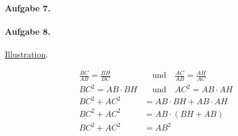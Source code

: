 \documentclass{article}
\begin{document}
\paragraph{Aufgabe 7.} 

\paragraph{Aufgabe 8.}

\href{https://commons.wikimedia.org/wiki/File:Pythagoras_similar_triangles_simplified.svg}{Illustration}.

\begin{align*}
    \frac{BC}{AB} = \frac{BH}{BC} &\quad\text{und}\quad \frac{AC}{AB} = \frac{AH}{AC} \\
    BC^2 = AB \cdot BH &\quad\text{und}\quad AC^2 = AB \cdot AH \\
    BC^2 + AC^2 &= AB \cdot BH + AB \cdot AH \\
    BC^2 + AC^2 &= AB \cdot (BH + AB) \\
    BC^2 + AC^2 &= AB^2
\end{align*}
\end{document}
